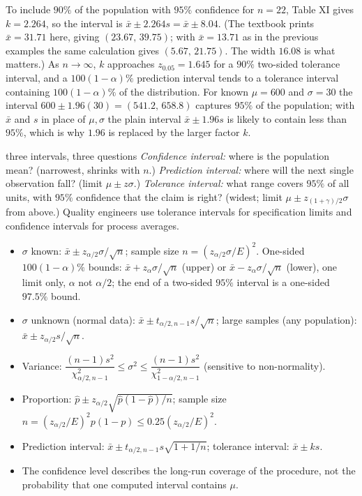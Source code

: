\begin{example}
To include $90\%$ of the population with $95\%$ confidence for $n=22$, Table XI gives $k=2.264$, so the interval is $\bar{x}\pm2.264s=\bar{x}\pm8.04$. (The textbook prints $\bar{x}=31.71$ here, giving $(23.67,\,39.75)$; with $\bar{x}=13.71$ as in the previous examples the same calculation gives $(5.67,\,21.75)$. The width $16.08$ is what matters.) As $n\to\infty$, $k$ approaches $z_{0.05}=1.645$ for a $90\%$ two-sided tolerance interval, and a $100(1-\alpha)\%$ prediction interval tends to a tolerance interval containing $100(1-\alpha)\%$ of the distribution. For known $\mu=600$ and $\sigma=30$ the interval $600\pm1.96(30)=(541.2,\,658.8)$ captures $95\%$ of the population; with $\bar{x}$ and $s$ in place of $\mu,\sigma$ the plain interval $\bar{x}\pm1.96s$ is likely to contain less than $95\%$, which is why $1.96$ is replaced by the larger factor $k$.
\end{example}

\begin{interview}{three intervals, three questions}
\emph{Confidence interval:} where is the population mean? (narrowest, shrinks with $n$.) \emph{Prediction interval:} where will the next single observation fall? (limit $\mu\pm z\sigma$.) \emph{Tolerance interval:} what range covers $95\%$ of all units, with $95\%$ confidence that the claim is right? (widest; limit $\mu\pm z_{(1+\gamma)/2}\sigma$ from above.) Quality engineers use tolerance intervals for specification limits and confidence intervals for process averages.
\end{interview}

\begin{summarybox}
\begin{itemize}
  \item $\sigma$ known: $\bar{x}\pm z_{\alpha/2}\sigma/\sqrt n$; sample size $n=(z_{\alpha/2}\sigma/E)^2$. One-sided $100(1-\alpha)\%$ bounds: $\bar{x}+z_\alpha\sigma/\sqrt n$ (upper) or $\bar{x}-z_\alpha\sigma/\sqrt n$ (lower), one limit only, $\alpha$ not $\alpha/2$; the end of a two-sided $95\%$ interval is a one-sided $97.5\%$ bound.
  \item $\sigma$ unknown (normal data): $\bar{x}\pm t_{\alpha/2,n-1}s/\sqrt n$; large samples (any population): $\bar{x}\pm z_{\alpha/2}s/\sqrt n$.
  \item Variance: $\dfrac{(n-1)s^2}{\chi^2_{\alpha/2,n-1}}\le\sigma^2\le\dfrac{(n-1)s^2}{\chi^2_{1-\alpha/2,n-1}}$ (sensitive to non-normality).
  \item Proportion: $\hat{p}\pm z_{\alpha/2}\sqrt{\hat{p}(1-\hat{p})/n}$; sample size $n=(z_{\alpha/2}/E)^2p(1-p)\le0.25(z_{\alpha/2}/E)^2$.
  \item Prediction interval: $\bar{x}\pm t_{\alpha/2,n-1}s\sqrt{1+1/n}$; tolerance interval: $\bar{x}\pm ks$.
  \item The confidence level describes the long-run coverage of the procedure, not the probability that one computed interval contains $\mu$.
\end{itemize}
\end{summarybox}

